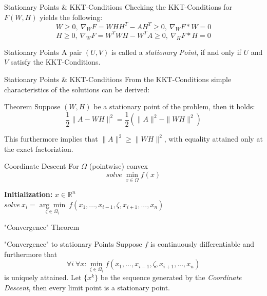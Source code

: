 \documentclass[aspectratio=169]{beamer}
\begin{document}
\begin{frame}{Stationary Points \& KKT-Conditions}
    Checking the KKT-Conditions for \(F(W,H) \) yields the following:
        \[ W \geq 0, \ \nabla_W F = WHH^T - AH^T \geq 0, \ \nabla_W F * W = 0 \]
        \[ H \geq 0, \ \nabla_W F = W^T WH - W^T A \geq 0, \ \nabla_H F * H = 0 \]

    \begin{block}{Stationary Points}
        A pair \((U,V)\) is called a \emph{stationary Point}, if and only if \(U\) and \(V\) satisfy the KKT-Conditions.
    \end{block}
    
\end{frame}

\begin{frame}{Stationary Points \& KKT-Conditions}
    From the KKT-Conditions simple characteristics of the solutions can be derived:
    \begin{block}{Theorem}
        Suppose \( (W,H)\) be a stationary point of the problem, then it holds:
        \[ \frac{1}{2} \|A - WH\|^2 = \frac{1}{2} (\|A\|^2 - \|WH\|^2 )\]
    \end{block}
    This furthermore implies that \( \|A\|^2 \geq \|WH\|^2\), with equality attained only at the exact factoriztion.
\end{frame}

\begin{frame}{Coordinate Descent}
    For $\Omega$ (pointwise) convex \[solve \ \min_{x \in \Omega} f(x) \]
    
    \begin{algorithm}[H]
    \caption{General Coordinate Descent}
        \textbf{Initialization:} \(x \in \mathbb{R}^n\) \\
         {$solve \ x_i = \underset{\zeta \in \Omega_i}{\arg \min} \ f(x_1, ..., x_{i-1}, \zeta, x_{i+1}, ..., x_n)$}
    \end{algorithm}
\end{frame}

\begin{frame}{"Convergence" Theorem}
    \begin{block}{"Convergence" to stationary Points}
        Suppose $f$ is continuously differentiable and furthermore that \\
        \[\forall i \ \forall x: \min_{\zeta \in \Omega_i} f(x_1, ..., x_{i-1}, \zeta, x_{i+1}, ..., x_n)\] 
        is uniquely attained.
        Let \( \{x^k\} \) be the sequence generated by the \emph{Coordinate Descent}, then every limit point is a stationary point.
    \end{block}
\end{frame}
\end{document}
